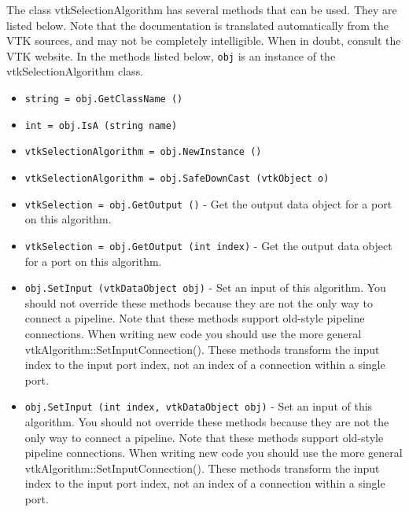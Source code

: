 The class vtkSelectionAlgorithm has several methods that can be used.
  They are listed below.
Note that the documentation is translated automatically from the VTK sources,
and may not be completely intelligible.  When in doubt, consult the VTK website.
In the methods listed below, \verb|obj| is an instance of the vtkSelectionAlgorithm class.
\begin{itemize}
\item  \verb|string = obj.GetClassName ()|

\item  \verb|int = obj.IsA (string name)|

\item  \verb|vtkSelectionAlgorithm = obj.NewInstance ()|

\item  \verb|vtkSelectionAlgorithm = obj.SafeDownCast (vtkObject o)|

\item  \verb|vtkSelection = obj.GetOutput ()| -  Get the output data object for a port on this algorithm.

\item  \verb|vtkSelection = obj.GetOutput (int index)| -  Get the output data object for a port on this algorithm.

\item  \verb|obj.SetInput (vtkDataObject obj)| -  Set an input of this algorithm. You should not override these
 methods because they are not the only way to connect a pipeline.
 Note that these methods support old-style pipeline connections.
 When writing new code you should use the more general
 vtkAlgorithm::SetInputConnection().  These methods transform the
 input index to the input port index, not an index of a connection
 within a single port.

\item  \verb|obj.SetInput (int index, vtkDataObject obj)| -  Set an input of this algorithm. You should not override these
 methods because they are not the only way to connect a pipeline.
 Note that these methods support old-style pipeline connections.
 When writing new code you should use the more general
 vtkAlgorithm::SetInputConnection().  These methods transform the
 input index to the input port index, not an index of a connection
 within a single port.

\end{itemize}
